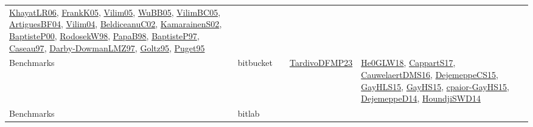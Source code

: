 {\begin{longtable}{llp{6cm}p{6cm}p{6cm}}
\href{articles/KhayatLR06.pdf}{KhayatLR06}\cite{KhayatLR06}, \href{papers/FrankK05.pdf}{FrankK05}\cite{FrankK05}, \href{papers/Vilim05.pdf}{Vilim05}\cite{Vilim05}, \href{papers/WuBB05.pdf}{WuBB05}\cite{WuBB05}, \href{articles/VilimBC05.pdf}{VilimBC05}\cite{VilimBC05}, \href{papers/ArtiguesBF04.pdf}{ArtiguesBF04}\cite{ArtiguesBF04}, \href{papers/Vilim04.pdf}{Vilim04}\cite{Vilim04}, \href{papers/BeldiceanuC02.pdf}{BeldiceanuC02}\cite{BeldiceanuC02}, \href{papers/KamarainenS02.pdf}{KamarainenS02}\cite{KamarainenS02}, \href{articles/BaptisteP00.pdf}{BaptisteP00}\cite{BaptisteP00}, \href{papers/RodosekW98.pdf}{RodosekW98}\cite{RodosekW98}, \href{articles/PapaB98.pdf}{PapaB98}\cite{PapaB98}, \href{papers/BaptisteP97.pdf}{BaptisteP97}\cite{BaptisteP97}, \href{papers/Caseau97.pdf}{Caseau97}\cite{Caseau97}, \href{articles/Darby-DowmanLMZ97.pdf}{Darby-DowmanLMZ97}\cite{Darby-DowmanLMZ97}, \href{papers/Goltz95.pdf}{Goltz95}\cite{Goltz95}, \href{papers/Puget95.pdf}{Puget95}\cite{Puget95}\\
Benchmarks & bitbucket &  & \href{papers/TardivoDFMP23.pdf}{TardivoDFMP23}\cite{TardivoDFMP23} & \href{papers/He0GLW18.pdf}{He0GLW18}\cite{He0GLW18}, \href{papers/CappartS17.pdf}{CappartS17}\cite{CappartS17}, \href{papers/CauwelaertDMS16.pdf}{CauwelaertDMS16}\cite{CauwelaertDMS16}, \href{papers/DejemeppeCS15.pdf}{DejemeppeCS15}\cite{DejemeppeCS15}, \href{papers/GayHLS15.pdf}{GayHLS15}\cite{GayHLS15}, \href{papers/GayHS15.pdf}{GayHS15}\cite{GayHS15}, \href{papers/cpaior-GayHS15.pdf}{cpaior-GayHS15}\cite{cpaior-GayHS15}, \href{papers/DejemeppeD14.pdf}{DejemeppeD14}\cite{DejemeppeD14}, \href{papers/HoundjiSWD14.pdf}{HoundjiSWD14}\cite{HoundjiSWD14}\\
Benchmarks & bitlab &  &  & \\

\end{longtable}}
